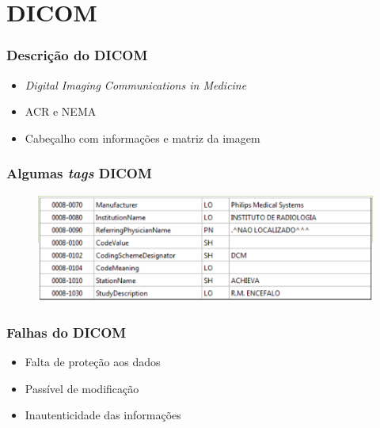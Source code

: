 \documentclass{beamer}
\begin{document}


\section{DICOM}
\begin{frame}
\frametitle{Descrição do DICOM}

\begin{itemize}
\item \textit{Digital Imaging Communications in Medicine}\newline
\item ACR e NEMA\newline
\item Cabeçalho com informações e matriz da imagem\newline
\end{itemize}
\end{frame}


\begin{frame}
\frametitle{Algumas \textit{tags} DICOM}
\begin{figure}  
\includegraphics[scale=.3]{table.png} 


\end{figure}
\end{frame}
\begin{frame}
\frametitle{Falhas do DICOM}

\begin{itemize}
\item Falta de proteção aos dados\newline
\item Passível de modificação\newline
\item Inautenticidade das informações
\end{itemize}

\end{frame}
\end{document}
